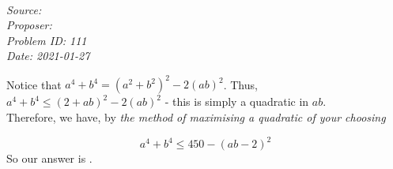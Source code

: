 \SSbreak\\
\emph{Source: \Cfolk}\\
\emph{Proposer: \Pss}\\
\emph{Problem ID: 111}\\
\emph{Date: 2021-01-27}\\
\SSbreak

\bigskip

\begin{solution}\hfil\medskip

Notice that \(a^4+b^4=(a^2+b^2)^2-2(ab)^2\). Thus, \(a^4+b^4\leq (2+ab)^2-2(ab)^2\) - this is simply a quadratic in \(ab\).\\

Therefore, we have, by \emph{the method of maximising a quadratic of your choosing}

\begin{equation*}
  a^4+b^4\leq 450-(ab-2)^2
\end{equation*}
So our answer is .
\end{solution}